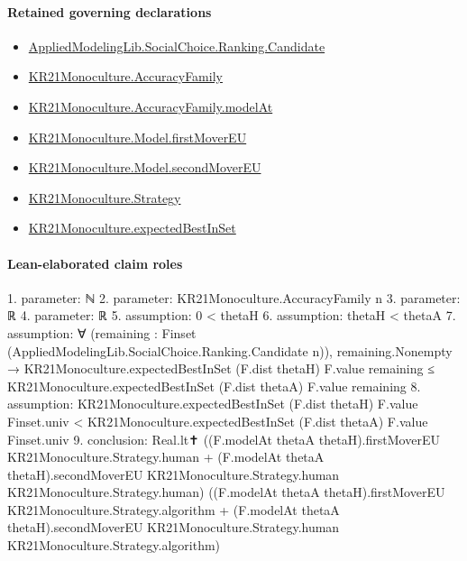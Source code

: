 \documentclass[10pt]{article}
\begin{document}
\paragraph{Retained governing declarations}
\begin{itemize}\raggedright
\item \hyperlink{library-prerequisite-8c0e6c25845ae78a}{Applied\allowbreak{}Modeling\allowbreak{}Lib.\allowbreak{}Social\allowbreak{}Choice.\allowbreak{}Ranking.\allowbreak{}Candidate}
\item \hyperlink{paper-prerequisite-a1353b2b1b6f0303}{KR21\allowbreak{}Monoculture.\allowbreak{}Accuracy\allowbreak{}Family}
\item \hyperlink{governing-declaration-869d6f3944f2bc91}{KR21\allowbreak{}Monoculture.\allowbreak{}Accuracy\allowbreak{}Family.\allowbreak{}model\allowbreak{}At}
\item \hyperlink{governing-declaration-c7e343ac9b4d37a5}{KR21\allowbreak{}Monoculture.\allowbreak{}Model.\allowbreak{}first\allowbreak{}Mover\allowbreak{}EU}
\item \hyperlink{governing-declaration-e4f79c4b5e166782}{KR21\allowbreak{}Monoculture.\allowbreak{}Model.\allowbreak{}second\allowbreak{}Mover\allowbreak{}EU}
\item \hyperlink{paper-prerequisite-b00425a844bd2ddf}{KR21\allowbreak{}Monoculture.\allowbreak{}Strategy}
\item \hyperlink{paper-prerequisite-b8698660538f90e1}{KR21\allowbreak{}Monoculture.\allowbreak{}expected\allowbreak{}Best\allowbreak{}In\allowbreak{}Set}
\end{itemize}
\paragraph{Lean-elaborated claim roles}\begin{ReviewVerbatim}
1. parameter: ℕ
2. parameter: KR21Monoculture.AccuracyFamily n
3. parameter: ℝ
4. parameter: ℝ
5. assumption: 0 < thetaH
6. assumption: thetaH < thetaA
7. assumption: ∀ (remaining : Finset (AppliedModelingLib.SocialChoice.Ranking.Candidate n)),
  remaining.Nonempty →
    KR21Monoculture.expectedBestInSet (F.dist thetaH) F.value remaining ≤
      KR21Monoculture.expectedBestInSet (F.dist thetaA) F.value remaining
8. assumption: KR21Monoculture.expectedBestInSet (F.dist thetaH) F.value Finset.univ <
  KR21Monoculture.expectedBestInSet (F.dist thetaA) F.value Finset.univ
9. conclusion: Real.lt✝
  ((F.modelAt thetaA thetaH).firstMoverEU KR21Monoculture.Strategy.human +
    (F.modelAt thetaA thetaH).secondMoverEU KR21Monoculture.Strategy.human KR21Monoculture.Strategy.human)
  ((F.modelAt thetaA thetaH).firstMoverEU KR21Monoculture.Strategy.algorithm +
    (F.modelAt thetaA thetaH).secondMoverEU KR21Monoculture.Strategy.human KR21Monoculture.Strategy.algorithm)
\end{ReviewVerbatim}
\end{document}

